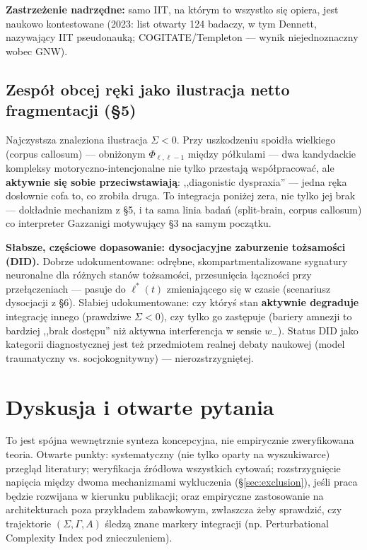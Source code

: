 \documentclass[11pt]{article}
\begin{document}
\textbf{Zastrzeżenie nadrzędne:} samo IIT, na którym to wszystko się opiera, jest naukowo kontestowane (2023: list otwarty 124 badaczy, w tym Dennett, nazywający IIT pseudonauką; COGITATE/Templeton --- wynik niejednoznaczny wobec GNW).

\subsection*{Zespół obcej ręki jako ilustracja netto fragmentacji (\S5)}

Najczystsza znaleziona ilustracja $\Sigma<0$. Przy uszkodzeniu spoidła wielkiego (corpus callosum) --- obniżonym $\Phi_{\ell,\ell-1}$ między półkulami --- dwa kandydackie kompleksy motoryczno-intencjonalne nie tylko przestają współpracować, ale \textbf{aktywnie się sobie przeciwstawiają}: ,,diagonistic dyspraxia'' --- jedna ręka dosłownie cofa to, co zrobiła druga. To integracja poniżej zera, nie tylko jej brak --- dokładnie mechanizm z \S5, i ta sama linia badań (split-brain, corpus callosum) co interpreter Gazzanigi motywujący \S3 na samym początku.

\textbf{Słabsze, częściowe dopasowanie: dysocjacyjne zaburzenie tożsamości (DID).} Dobrze udokumentowane: odrębne, skompartmentalizowane sygnatury neuronalne dla różnych stanów tożsamości, przesunięcia łączności przy przełączeniach --- pasuje do $\ell^*(t)$ zmieniającego się w czasie (scenariusz dysocjacji z \S6). Słabiej udokumentowane: czy któryś stan \textbf{aktywnie degraduje} integrację innego (prawdziwe $\Sigma<0$), czy tylko go zastępuje (bariery amnezji to bardziej ,,brak dostępu'' niż aktywna interferencja w sensie $w_-$). Status DID jako kategorii diagnostycznej jest też przedmiotem realnej debaty naukowej (model traumatyczny vs. socjokognitywny) --- nierozstrzygniętej.

\section{Dyskusja i otwarte pytania}



To jest spójna wewnętrznie synteza koncepcyjna, nie empirycznie zweryfikowana teoria. Otwarte punkty: systematyczny (nie tylko oparty na wyszukiwarce) przegląd literatury; weryfikacja źródłowa wszystkich cytowań; rozstrzygnięcie napięcia między dwoma mechanizmami wykluczenia (\S\ref{sec:exclusion}), jeśli praca będzie rozwijana w kierunku publikacji; oraz empiryczne zastosowanie na architekturach poza przykładem zabawkowym, zwłaszcza żeby sprawdzić, czy trajektorie $(\Sigma,\Gamma,A)$ śledzą znane markery integracji (np. Perturbational Complexity Index pod znieczuleniem).
\end{document}
